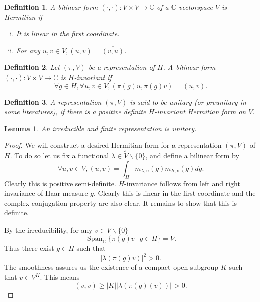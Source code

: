\documentclass[8pt]{article}
\newtheorem{definition}{Definition}[section]
\newtheorem{lemma}{Lemma}[section]
\DeclareMathOperator{\Span}{Span}
\newcommand{\C}[0]{\mathbb{C}}
\newcommand{\sep}[0]{\:|\:}
\newcommand{\zero}[0]{\{0\}}
\newcommand{\nonzero}[0]{\backslash\zero}
\begin{document}
\begin{definition}
  A bilinear form $(\cdot,\cdot):V\times V\to \C$ of a $\C$-vectorspace $V$ is Hermitian if 
  \begin{enumerate}[i).]
    \item It is linear in the first coordinate.
    \item For any $u,v\in V,(u,v) = \overline{(v,u)}$.
  \end{enumerate}
\end{definition}
\begin{definition}
Let $(\pi,V)$ be a representation of $H$. A bilinear form $(\cdot,\cdot):V\times V\to \C$ is $H$-invariant if 
\begin{equation*}
  \forall g\in H,\forall u,v\in V, (\pi(g)u,\pi(g)v) = (u,v).
\end{equation*}
\end{definition}
\begin{definition}
A representation $(\pi,V)$ is said to be unitary (or preunitary in some literatures), if there 
is a positive definite $H$-invariant Hermitian form on $V$.
\end{definition}
\begin{lemma}
  An irreducible and finite representation is unitary.
  \label{unitary_sufficent_condition}
  \label{lemma_11}
\end{lemma}

\begin{proof}
  We will construct a desired Hermitian form for a representation $(\pi,V)$ of $H$. To do so let us fix a functional $\lambda\in\widetilde{V}\backslash\{0\}$,
  and define a bilinear form by
  \begin{equation*}
    \forall u,v\in V, (u,v) = \int_H m_{\lambda,u}(g)\overline{m_{\lambda,v}(g)}dg.
  \end{equation*}
  Clearly this is positive semi-definite. $H$-invariance follows from left and right invariance of Haar measure $g$.
  Clearly this is linear in the first coordinate and the complex conjugation property are also clear. It remains to show that this is definite. 
  \par By the irreducibility, for any $v\in V\nonzero$
  \begin{equation*}
    \Span_\C\{\pi(g)v\sep g\in H\} = V.
  \end{equation*}
  Thus there exist $g\in H$ such that 
  \begin{equation*}
    \vert\lambda(\pi(g)v)\vert^2>0.
  \end{equation*}
  The smoothness assures us the existence of a compact open subgroup $K$ such that $v\in V^K$. This means
  \begin{equation*}
    (v,v)\geq \vert K\vert \vert\lambda(\pi(g)(v))\vert >0.
  \end{equation*}
\end{proof}
\end{document}
